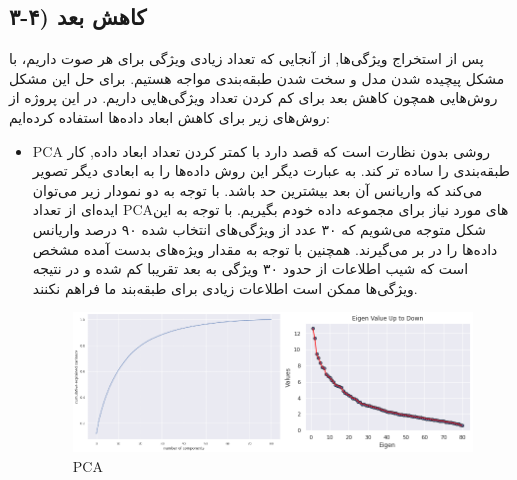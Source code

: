 \documentclass{article}
\begin{document}
\subsection{۳-۴) کاهش بعد}
پس از استخراج ویژگی‌ها, از آنجایی که تعداد زیادی ویژگی برای هر صوت داریم، با مشکل پیچیده شدن مدل و سخت شدن طبقه‌بندی مواجه هستیم. برای حل این مشکل روش‌هایی همچون کاهش بعد برای کم کردن تعداد ویژگی‌هایی داریم.
در این پروژه از روش‌های زیر برای کاهش ابعاد داده‌ها استفاده کرده‌ایم:
\begin{itemize}
	\item PCA \newline
 روشی بدون نظارت است که قصد دارد با کمتر کردن تعداد ابعاد داده, کار طبقه‌بندی را ساده تر کند. به عبارت دیگر این روش داده‌ها را به ابعادی دیگر تصویر می‌کند که واریانس آن بعد بیشترین حد باشد.
	با توجه به دو نمودار زیر می‌توان ایده‌ای از تعداد PCAهای مورد نیاز برای مجموعه داده خودم بگیریم.
	 با توجه به این شکل متوجه می‌شویم که ۳۰ عدد از ویژگی‌های انتخاب شده ۹۰ درصد واریانس داده‌ها را در بر می‌گیرند. همچنین با توجه به مقدار ویژه‌های بدست آمده مشخص است که شیب اطلاعات از حدود ۳۰ ویژگی به بعد تقریبا کم شده و در نتیجه ویژگی‌ها ممکن است اطلاعات زیادی برای طبقه‌بند ما فراهم نکنند.
	 \begin{figure}[h]
	 	\centering
	 	\includegraphics[width=0.7\linewidth]{Photo/36}
	 	\caption[PCA]{PCA}
	 	\label{fig:36}
	 \end{figure}
 

\end{itemize}
\end{document}
